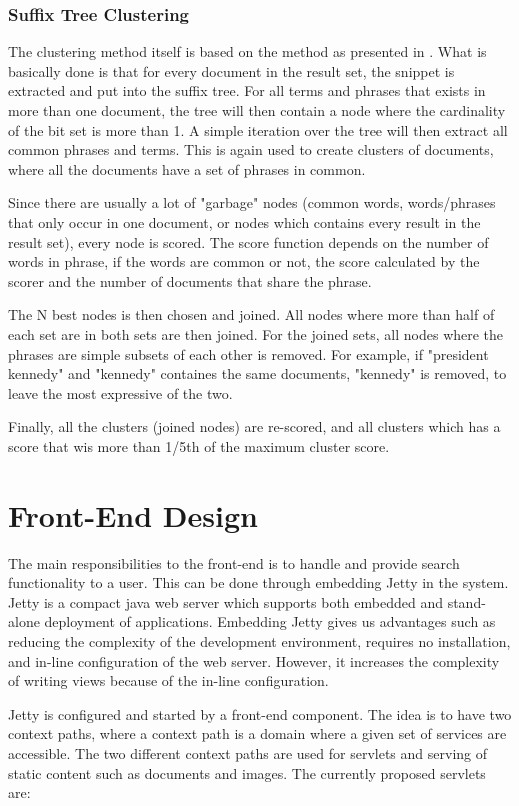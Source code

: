 \subsubsection{Suffix Tree Clustering}

The clustering method itself is based on the method as presented in \cite{zamir}. What is basically done is that for every document in the result set, the snippet is extracted and put into the suffix tree. For all terms and phrases that exists in more than one document, the tree will then contain a node where the cardinality of the bit set is more than 1. A simple iteration over the tree will then extract all common phrases and terms. This is again used to create clusters of documents, where all the documents have a set of phrases in common.

Since there are usually a lot of "garbage" nodes (common words, words/phrases that only occur in one document, or nodes which contains every result in the result set), every node is scored. The score function depends on the number of words in phrase, if the words are common or not, the score calculated by the scorer and the number of documents that share the phrase. 

The N best nodes is then chosen and joined. All nodes where more than half of each set are in both sets are then joined. For the joined sets,  all nodes where the phrases are simple subsets of each other is removed. For example, if "president kennedy" and "kennedy" containes the same documents, "kennedy" is removed, to leave the most expressive of the two.

Finally, all the clusters (joined nodes) are re-scored, and all clusters which has a score that wis more than 1/5th of the maximum cluster score.

\section{Front-End Design}
The main responsibilities to the front-end is to handle and provide search functionality to a user. This can be done through embedding Jetty in the system. Jetty is a compact java web server which supports both embedded and stand-alone deployment of applications. Embedding Jetty gives us advantages such as reducing the complexity of the development environment, requires no installation, and in-line configuration of the web server. However, it increases the complexity of writing views because of the in-line configuration.

Jetty is configured and started by a front-end component. The idea is to have two context paths, where a context path is a domain where a given set of services are accessible. The two different context paths are used for servlets and serving of static content such as documents and images. The currently proposed servlets are:

